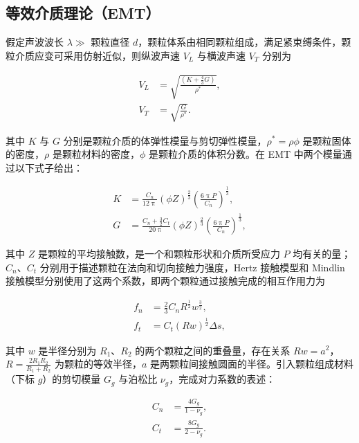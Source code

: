 \subsection{等效介质理论（EMT）}

假定声波波长 $\lambda\gg$ 颗粒直径 $d$，颗粒体系由相同颗粒组成，满足紧束缚条件，颗粒介质应变可采用仿射近似，则纵波声速 $V_{L}$ 与横波声速 $V_{T}$ 分别为

\begin{align}
  V_{L} &= \sqrt{\frac{(K+\frac{4}{3}G)}{\rho^{*}}},\label{eq:emt_velocity_L}\\
  V_{T} &= \sqrt{\frac{G}{\rho^{*}}}.\label{eq:emt_velocity_T}
\end{align}

其中 $K$ 与 $G$ 分别是颗粒介质的体弹性模量与剪切弹性模量，$\rho^{*}=\rho\phi$ 是颗粒固体的密度，$\rho$ 是颗粒材料的密度，$\phi$ 是颗粒介质的体积分数。在 EMT 中两个模量通过以下式子给出：

\begin{align}
  K &= \frac{C_{n}}{12\uppi}\left(\phi Z\right)^{\frac{2}{3}}\left(\frac{6\uppi P}{C_{n}}\right)^{\frac{1}{3}},\\
  G &= \frac{C_{n} + \frac{3}{2}C_{t}}{20\uppi}\left(\phi Z\right)^{\frac{2}{3}}\left(\frac{6\uppi P}{C_{n}}\right)^{\frac{1}{3}},
\end{align}

其中 $Z$ 是颗粒的平均接触数，是一个和颗粒形状和介质所受应力 $P$ 均有关的量\cite{vandenwildenbergProbingEffectParticle2015}；$C_{n}$、$C_{t}$ 分别用于描述颗粒在法向和切向接触力强度，Hertz 接触模型和 Mindlin 接触模型分别使用了这两个系数，即两个颗粒通过接触完成的相互作用力为

\begin{align}
  f_{n} &= \frac{2}{3}C_{n}R^{\frac{1}{2}}w^{\frac{3}{2}},\label{eq:contact_force_norm}\\
  f_{t} &= C_{t}(Rw)^{\frac{1}{2}}\Delta s\label{eq:contact_force_tan},
\end{align}

其中 $w$ 是半径分别为 $R_{1}$、$R_{2}$ 的两个颗粒之间的重叠量，存在关系 $Rw = a^2$，$R = \frac{2R_{1}R_{2}}{R_{1} + R_{2}}$ 为颗粒的等效半径，$a$ 是两颗粒间接触圆面的半径。引入颗粒组成材料（下标 $g$）的剪切模量 $G_{g}$ 与泊松比 $\nu_{g}$，完成对力系数的表述：

\begin{align}
  C_{n} &= \frac{4G_{g}}{1-\nu_{g}},\\
  C_{t} &= \frac{8G_{g}}{2-\nu_{g}}.
\end{align}

